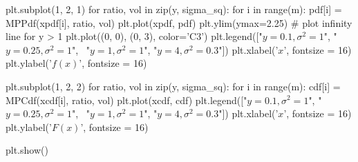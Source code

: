 \documentclass[a4paper,11pt]{article}
\theoremstyle{plain}
\theoremstyle{definition}
\begin{document}
\begin{appendices}
\begin{python}
    plt.subplot(1, 2, 1)
    for ratio, vol in zip(y, sigma_sq):
        for i in range(m):
    	    pdf[i] = MPPdf(xpdf[i], ratio, vol)
        plt.plot(xpdf, pdf)
    plt.ylim(ymax=2.25)
    # plot infinity line for y > 1
    plt.plot((0, 0), (0, 3), color='C3')
    plt.legend(["$y=0.1, \sigma^2=1$", "$y=0.25, \sigma^2=1$", \
        "$y=1, \sigma^2=1$", "$y=4, \sigma^2=0.3$"])
    plt.xlabel('$x$', fontsize = 16)
    plt.ylabel('$f(x)$', fontsize = 16)
	
    plt.subplot(1, 2, 2)
    for ratio, vol in zip(y, sigma_sq):
        for i in range(m):
            cdf[i] = MPCdf(xcdf[i], ratio, vol)
        plt.plot(xcdf, cdf)
    plt.legend(["$y=0.1, \sigma^2=1$", "$y=0.25, \sigma^2=1$", \
        "$y=1, \sigma^2=1$", "$y=4, \sigma^2=0.3$"]) 
    plt.xlabel('$x$', fontsize = 16)
    plt.ylabel('$F(x)$', fontsize = 16)
	
    plt.show()
    	\end{python}
    	
    \end{appendices}
\end{document}
